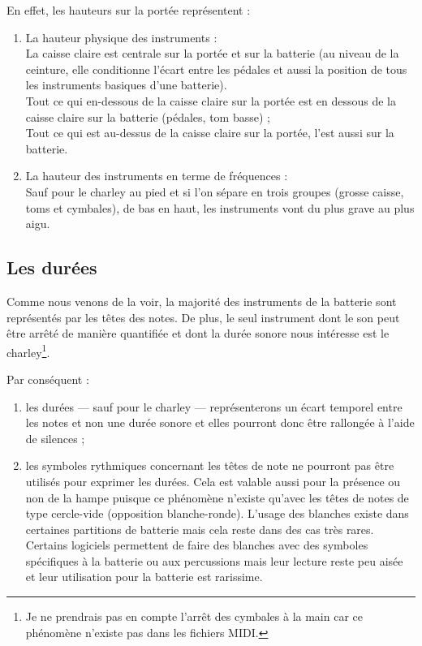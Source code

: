En effet, les hauteurs sur la portée représentent :
\begin{enumerate}
	\item La hauteur physique des instruments :\\
	La caisse claire est centrale sur la portée et sur la batterie (au niveau
    de la ceinture, elle conditionne l’écart entre les pédales et aussi la
    position de tous les instruments basiques d’une batterie).\\
	Tout ce qui en-dessous de la caisse claire sur la portée est en dessous de
    la caisse claire sur la batterie (pédales, tom basse) ;\\
	Tout ce qui est au-dessus de la caisse claire sur la portée, l’est aussi
    sur la batterie.\\
	\item La hauteur des instruments en terme de fréquences :\\
	Sauf pour le charley au pied et si l’on sépare en trois groupes
    (grosse caisse, toms et cymbales), de bas en haut, les instruments vont du
    plus grave au plus aigu.
\end{enumerate}

\subsection*{Les durées}
\label{hho}
Comme nous venons de la voir, la majorité des instruments de la batterie sont
représentés par les têtes des notes. De plus, le seul instrument dont le son
peut être arrêté de manière quantifiée et dont la durée sonore nous intéresse
est le charley\footnote{Je ne prendrais pas en compte l’arrêt des cymbales à la
main car ce phénomène n’existe pas dans les fichiers MIDI.}.

Par conséquent :
\begin{enumerate}
    \item les durées — sauf pour le charley — représenterons un écart temporel
        entre les notes et non une durée sonore et elles pourront donc être
        rallongée à l’aide de silences ;
    \item les symboles rythmiques concernant les têtes de note ne pourront pas
        être utilisés pour exprimer les durées. Cela est valable aussi pour la
        présence ou non de la hampe puisque ce phénomène n’existe qu’avec les
        têtes de notes de type cercle-vide (opposition blanche-ronde). L’usage
        des blanches existe dans certaines partitions de batterie
        \cite{system_drums} mais cela reste dans des cas très rares. Certains
        logiciels permettent de faire des blanches avec des symboles
        spécifiques à la batterie ou aux percussions mais leur lecture reste
        peu aisée et leur utilisation pour la batterie est rarissime.\\
\end{enumerate}

